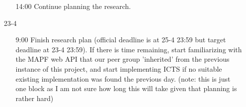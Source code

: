 \documentclass[a4paper,10pt,english]{article}
\begin{document}
\begin{enumerate}
\begin{enumerate}
		\item[14:00] Continue planning the research.
	\end{enumerate}
	\item[23-4]\begin{enumerate}
		\item[9:00]  Finish research plan (official deadline is at 25-4 23:59 but target deadline at 23-4 23:59). If there is time remaining, start familiarizing with the MAPF web API that our peer group 'inherited' from the previous instance of this project, and start implementing ICTS if no suitable existing implementation was found the previous day. (note: this is just one block as I am not sure how long this will take given that planning is rather hard)
	\end{enumerate}
\end{enumerate}
\printbibliography
\end{document}
